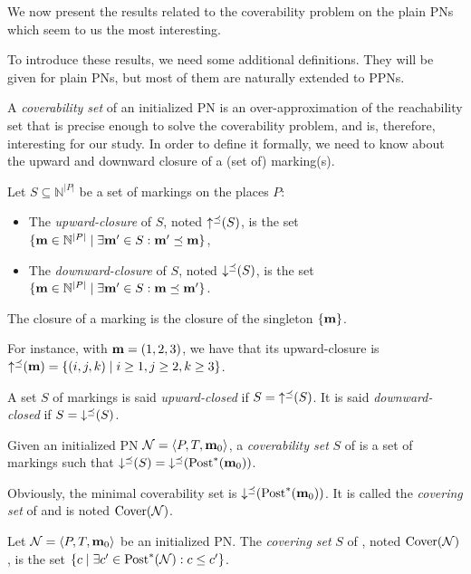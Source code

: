 We now present the results related to the coverability problem on the plain \acp{PN} which seem to us the most interesting.

To introduce these results, we need some additional definitions.
They will be given for plain \acp{PN}, but most of them are naturally extended to \acp{PPN}.

A \emph{coverability set} of an initialized \ac{PN} is an over-approximation of the reachability set that is precise enough to solve the coverability problem, and is, therefore, interesting for our study.
In order to define it formally, we need to know about the upward and downward closure of a (set of) marking(s).

\begin{defi}
  Let $S \subseteq \mathbb{N}^{|P|}$ be a set of markings on the places $P$:
  \begin{itemize}
    \item The \emph{upward-closure} of $S$, noted $\operatorname{\uparrow^\preceq}(S)$, is the set
      $\{\mathbf{m} \in \mathbb{N}^{|P|} \mid \exists \mathbf{m'} \in S : \mathbf{m'} \preceq \mathbf{m}\}$,
    \item The \emph{downward-closure} of $S$, noted $\operatorname{\downarrow^\preceq}(S)$, is the set
      $\{\mathbf{m} \in \mathbb{N}^{|P|} \mid \exists \mathbf{m'} \in S : \mathbf{m} \preceq \mathbf{m'}\}$.
  \end{itemize}
  The closure of a marking \mar is the closure of the singleton $\{\mathbf{m}\}$.
\end{defi}

For instance, with $\mathbf{m} = (1, 2, 3)$, we have that its upward-closure is $\operatorname{\uparrow^\preceq}(\mathbf{m}) = \{(i, j, k) \mid i \geq 1, j \geq 2, k \geq 3\}$.

\begin{defi}
  A set $S$ of markings is said \emph{upward-closed} if $S = \operatorname{\uparrow^\preceq}(S)$.
  It is said \emph{downward-closed} if $S = \operatorname{\downarrow^\preceq}(S)$.
\end{defi}

\begin{defi}
  Given an initialized \ac{PN} $\mathcal{N} = \langle P,T, \mathbf{m}_0\rangle$, a \emph{coverability set} $S$ of \N is a set of markings such that $\operatorname{\downarrow^\preceq}(S) = \operatorname{\downarrow^\preceq}(\operatorname{Post}^*(\mathbf{m}_0))$.
\end{defi}

Obviously, the minimal coverability set is $\operatorname{\downarrow^\preceq}(\operatorname{Post}^*(\mathbf{m}_0))$.
It is called the \emph{covering set} of \N and is noted $\operatorname{Cover}(\mathcal{N})$.

\begin{defi}
  Let $\mathcal{N} = \langle P,T, \mathbf{m}_0\rangle$ be an initialized \ac{PN}. The \emph{covering set} $S$ of \N, noted $\operatorname{Cover}(\mathcal{N})$, is the set $\{c \mid \exists c' \in \operatorname{Post}^*(\mathcal{N}) : c \leq c' \}$.
\end{defi}

